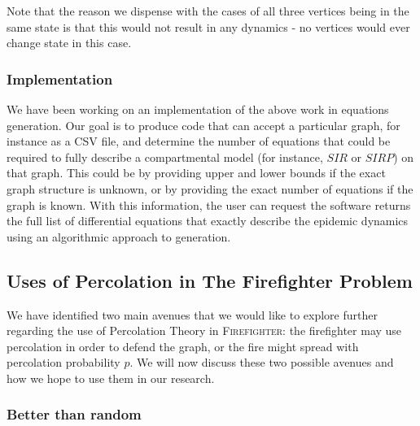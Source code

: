 \documentclass[../report.tex]{subfiles}
\begin{document}
Note that the reason we dispense with the cases of all three vertices being in the same state is that this would not result in any dynamics - no vertices would ever change state in this case. 

\subsubsection{Implementation}
\label{subsubsec:implementation}

We have been working on an implementation of the above work in equations generation. Our goal is to produce code that can accept a particular graph, for instance as a CSV file, and determine the number of equations that could be required to fully describe a compartmental model (for instance, $SIR$ or $SIRP$) on that graph. This could be by providing upper and lower bounds if the exact graph structure is unknown, or by providing the exact number of equations if the graph is known. With this information, the user can request the software returns the full list of differential equations that exactly describe the epidemic dynamics using an algorithmic approach to generation.

\subsection{Uses of Percolation in The Firefighter Problem}
\label{subsec:perc-fire}

We have identified two main avenues that we would like to explore further regarding the use of Percolation Theory in {\scshape Firefighter}: the firefighter may use percolation in order to defend the graph, or the fire might spread with percolation probability $p$. We will now discuss these two possible avenues and how we hope to use them in our research.



\subsubsection{Better than random}
\end{document}
